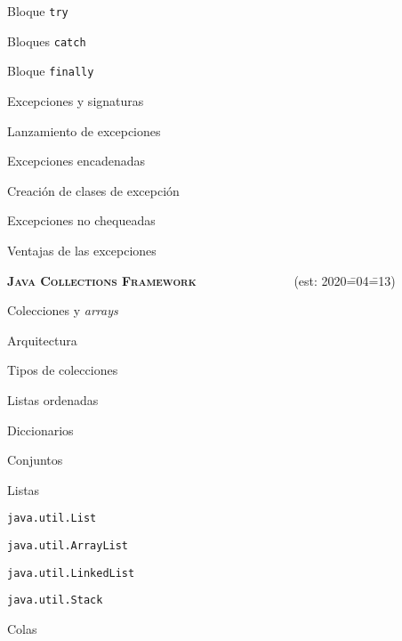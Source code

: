 \begin{longenum}
\begin{longenum}
\begin{longenum}
            \item Bloque \texttt{try}
            \item Bloques \texttt{catch}
            \item Bloque \texttt{finally}
        \end{longenum}
        \item Excepciones y signaturas
        \item Lanzamiento de excepciones
        \begin{longenum}
            \item Excepciones encadenadas
            \item Creación de clases de excepción
        \end{longenum}
        \item Excepciones no chequeadas
        \item Ventajas de las excepciones
    \end{longenum}
    \item \textbf{\textsc{Java Collections Framework}} \ \ \ \ \ \ \ \ \ \ \ \ \ \ \ (est: 2020\==04\==13)
    \begin{longenum}
        \item Colecciones y \textit{arrays}
        \item Arquitectura
        \item Tipos de colecciones
        \begin{longenum}
            \item Listas ordenadas
            \item Diccionarios
            \item Conjuntos
        \end{longenum}
        \item Listas
        \begin{longenum}
            \item \texttt{java.util.List}
            \begin{longenum}
                \item \texttt{java.util.ArrayList}
                \item \texttt{java.util.LinkedList}
                \item \texttt{java.util.Stack}
            \end{longenum}
        \end{longenum}
        \item Colas
        \begin{longenum}

\end{longenum}
\end{longenum}
\end{longenum}
